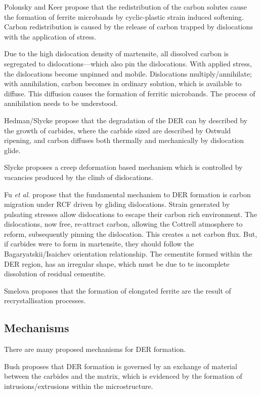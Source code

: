 \documentclass[a4paper]{article}
\begin{document}
Polonsky and Keer propose that the redistribution of the carbon
solutes cause the formation of ferrite microbands by 
cyclic-plastic strain induced softening. Carbon redistribution
is caused by the release of carbon trapped by dislocations with the
application of stress. 

Due to the high dislocation density of martensite, all dissolved
carbon is segregated to dislocations---which also pin the
dislocations. With applied stress, the dislocations become unpinned
and mobile. Dislocations multiply/annihilate; with annihilation,
carbon becomes in ordinary solution, which is available to
diffuse. This diffusion causes the formation of ferritic
microbands. The process of annihilation needs to be understood. 

Hedman/Slycke propose that the degradation of the DER can by
described by the growth of carbides, where the carbide sized are
described by Ostwald ripening, and carbon diffuses both thermally
and mechanically by dislocation glide. 

Slycke proposes a creep deformation based mechanism which is
controlled by vacancies produced by the climb of dislocations. 

Fu \emph{et al.} propose that the fundamental mechanism to DER formation
is carbon migration under RCF driven by gliding dislocations. Strain
generated by pulsating stresses allow dislocations to escape their
carbon rich environment. The dislocations, now free, re-attract
carbon, allowing the Cottrell atmosphere to reform, subsequently
pinning the dislocation. This creates a net carbon flux. But, if
carbides were to form in martensite, they should follow the
Bagaryatskii/Isaichev orientation relationship. The cementite formed
within the DER region, has an irregular shape, which must be due to
te incomplete dissolution of residual cementite. 

Smelova proposes that the formation of elongated ferrite are the
result of recrystallisation processes. 

\subsection{Mechanisms}
\label{sec:orgea085c9}

There are many proposed mechanisms for DER formation.

Bush proposes that DER formation is governed by an
exchange of material between the carbides and the matrix, which is
evidenced by the formation of intrusions/extrusions within the
microstructure. 
\end{document}
